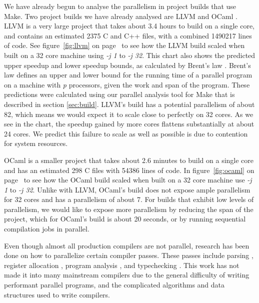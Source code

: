 \documentclass[10pt]{article}
\begin{document}
We have already begun to analyse the parallelism in project builds that use Make.  Two
project builds we have already analysed are LLVM \cite{lattner2002llvm} and OCaml \cite{ocaml}.
LLVM is a very large project that takes about 3.4 hours to build on a
single core, and contains an estimated 2375 C and C++ files, with a combined 1490217 lines of code.
See figure~\ref{fig:llvm} on page~\pageref{fig:llvm} to see how the LLVM build scaled
when built on a 32 core machine using \emph{-j 1} to \emph{-j 32}.
This chart also shows the predicted upper speedup and lower speedup bounds, as
calculated by Brent's law \cite{brent1974parallel}.  Brent's law defines an upper and lower bound for
the running time of a parallel program on a machine with \emph{p} processors, given the work and span of
the program.  These predictions were calculated using our
parallel analysis tool for Make that is described in section \ref{sec:build}.  LLVM's build has
a potential parallelism of about 82, which means we would expect it to scale close to perfectly on 32 cores.
As we see in the chart, the speedup gained by more cores flattens substantially at about 24 cores.
We predict this failure to scale as well as possible is due to contention for system resources.


OCaml is a smaller project that takes about 2.6 minutes to build on a single core and has an estimated 298 C files with 54386 lines of code.
In figure~\ref{fig:ocaml} on page~\pageref{fig:ocaml} to see how the OCaml build scaled
when built on a 32 core machine use \emph{-j 1} to \emph{-j 32}.  Unlike with LLVM, OCaml's build does not expose ample parallelism for 32 cores and
has a parallelism of about 7.  For builds that exhibit low levels of parallelism, we would like to
expose more parallelism by reducing the span of the project, which for OCaml's build is about 20 seconds,
or by running sequential compilation jobs in parallel.


Even though almost all production compilers are not parallel, research
has been done on how to parallelize certain compiler passes.  These passes include
parsing \cite{barenghi2015parallel}, register allocation \cite{makowski1995achieving, zobel1993program}, program analysis
\cite{kuper2014freeze, mendez2010parallel, prabhu2011eigencfa, zobel1992program}, and typechecking \cite{newton2016parallel}.
This work has not made it into many mainstream compilers due to the general difficulty of writing
performant parallel programs, and the complicated algorithms and data structures used to write compilers.
\end{document}
